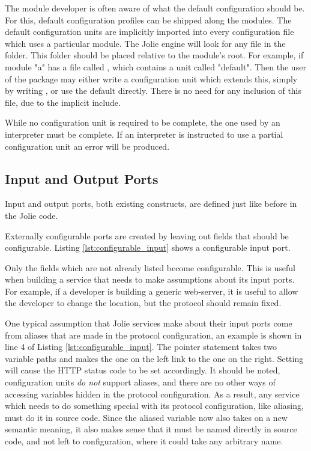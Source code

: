 The module developer is often aware of what the default configuration should
be.  For this, default configuration profiles can be shipped along the modules.
The default configuration units are implicitly imported into every
configuration file which uses a particular module.  The Jolie engine will look
for any  file in the  folder. This folder should be
placed relative to the module's root. For example, if module "a" has a file
called , which contains a unit called "default".
Then the user of the package may either write a configuration unit which
extends this, simply by writing , or use the default directly. There is no need for any
    inclusion of this file, due to the implicit include.

While no configuration unit is required to be complete, the one used by an
interpreter must be complete. If an interpreter is instructed to use a partial
configuration unit an error will be produced.

\subsection{Input and Output Ports}

Input and output ports, both existing constructs, are defined just like before
in the Jolie code.

Externally configurable ports are created by leaving out fields that should be
configurable. Listing \ref{lst:configurable_input} shows a configurable input
port.

Only the fields which are not already listed become configurable. This is
useful when building a service that needs to make assumptions about its input
ports. For example, if a developer is building a generic web-server, it is
useful to allow the developer to change the location, but the protocol should
remain fixed.

One typical assumption that Jolie services make about their input ports come
from aliases that are made in the protocol configuration, an example is shown
in line 4 of Listing \ref{lst:configurable_input}. The pointer statement takes
two variable paths and makes the one on the left link to the one on the right.
Setting  will cause the HTTP status code to be set
accordingly. It should be noted, configuration units \emph{do not} support
aliases, and there are no other ways of accessing variables hidden in the
protocol configuration. As a result, any service which needs to do something
special with its protocol configuration, like aliasing, must do it in source
code. Since the aliased variable now also takes on a new semantic meaning, it
also makes sense that it must be named directly in source code, and not left to
configuration, where it could take any arbitrary name.


